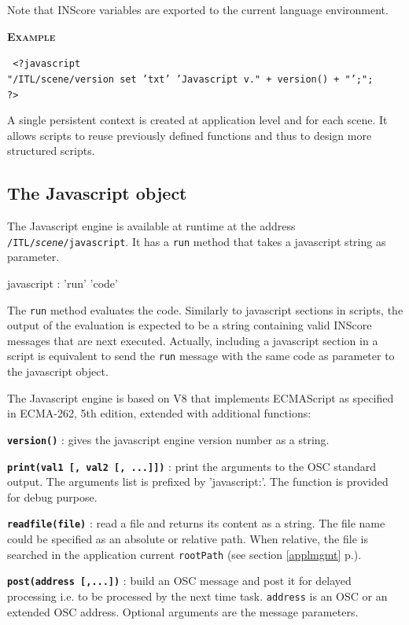 \documentclass[a4paper,twoside]{report}
\newcommand{\subsublevel}[1]	{\subsection{#1}}
\newcommand{\fullref}[1]	{\ref{#1} p.\pageref{#1}}
\newcommand{\OSC}[1]		{\texttt{#1}}
\newcommand{\example}		{\textbf{\hspace{-1.5cm}\textbf{\textsc{Example }}}}
\let\olditemize\itemize
\let\oldenditemize\enditemize
\renewenvironment{itemize} 	{\olditemize \setlength{\itemsep}{1mm}}{\oldenditemize}
\newcommand{\sample}	[1]			{\vspace{-2mm}\begin{center}\colorbox{mygrey}{
								\begin{minipage}[t]{0.9\columnwidth} 
								{\small \texttt{#1}}
								\end{minipage}}\end{center}}
\begin{document}
Note that INScore variables are exported to the current language environment.

\example
\sample{
<?javascript \\
\hspace*{3mm} "/ITL/scene/version set 'txt' 'Javascript v."  + version() + "';"; \\
\hspace*{1mm} ?>
}


A single persistent context is created at application level and for each scene.
It allows scripts to reuse previously defined functions and thus to design more structured scripts.


\subsublevel{The Javascript object}\label{jsobj}

The Javascript engine is available at runtime at the address \OSC{/ITL/\textit{scene}/javascript}. It has a \OSC{run} method that takes a javascript string as parameter.

\begin{rail} 
javascript :  'run' 'code'
\end{rail}

The \OSC{run} method evaluates the code. Similarly to javascript sections in scripts, the output of the evaluation is expected to be a string containing valid INScore messages that are next executed. 
Actually, including a javascript section in a script is equivalent to send the \OSC{run} message with the same code as parameter to the javascript object.

The Javascript engine is based on V8 that implements ECMAScript as specified in ECMA-262, 5th edition, extended with additional functions:
\begin{itemize}
\item \textbf{\OSC{version()}} : gives the javascript engine version number as a string.
\item \textbf{\OSC{print(val1 [, val2 [, ...]])}} : print the arguments to the OSC standard output. The arguments list is prefixed by 'javascript:'. The function is provided for debug purpose.
\item \textbf{\OSC{readfile(file)}} : read a file and returns its content as a string. The file name could be specified as an absolute or relative path. When relative, the file is searched in the application current \OSC{rootPath} (see section \fullref{applmgmt}).
\item \textbf{\OSC{post(address [,...])}} : build an OSC message and post it for delayed processing i.e. to be processed by the next time task. \OSC{address} is an OSC or an extended OSC address. Optional arguments are the message parameters.
\end{itemize}
\end{document}
